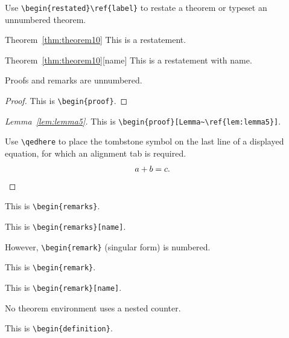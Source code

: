 Use \texttt{\textbackslash begin\{restated\}{\textbackslash ref\{label\}}} to restate a theorem or typeset an unnumbered theorem.

\begin{restated}{Theorem~\ref{thm:theorem10}}
This is a restatement.
\end{restated}

\begin{restated}{Theorem~\ref{thm:theorem10}}[name]
This is a restatement with name.
\end{restated}

\noindent
Proofs and remarks are unnumbered.

\begin{proof}
This is \texttt{\textbackslash begin\{proof\}}.
\end{proof}

\begin{proof}[Lemma~\ref{lem:lemma5}]
This is \texttt{\textbackslash begin\{proof\}[Lemma\textasciitilde\textbackslash ref\{lem:lemma5\}]}.

Use \texttt{\textbackslash qedhere} to place the tombstone symbol
on the last line of a displayed equation,
for which an alignment tab is required.
\begin{align*}
a+b&{}=c.
\qedhere
\end{align*}
\end{proof}

\begin{remarks}
This is \texttt{\textbackslash begin\{remarks\}}.
\end{remarks}

\begin{remarks}[name]
This is \texttt{\textbackslash begin\{remarks\}[name]}.
\end{remarks}

\noindent
However, \texttt{\textbackslash begin\{remark\}} (singular form) is numbered.

\begin{remark}
This is \texttt{\textbackslash begin\{remark\}}.
\end{remark}

\begin{remark}[name]
This is \texttt{\textbackslash begin\{remark\}[name]}.
\end{remark}

\noindent
No theorem environment uses a nested counter.

\begin{definition}
This is \texttt{\textbackslash begin\{definition\}}.
\end{definition}

